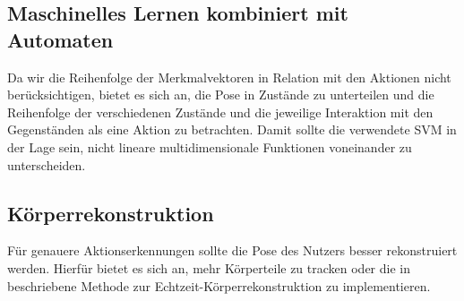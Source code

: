 \subsection{Maschinelles Lernen kombiniert mit Automaten}
Da wir die Reihenfolge der Merkmalvektoren in Relation mit den Aktionen nicht berücksichtigen, bietet es sich an, die Pose in Zustände zu unterteilen und die Reihenfolge der verschiedenen Zustände und die jeweilige Interaktion mit den Gegenständen als eine Aktion zu betrachten. Damit sollte die verwendete SVM in der Lage sein, nicht lineare multidimensionale Funktionen voneinander zu unterscheiden.

\subsection{Körperrekonstruktion}
Für genauere Aktionserkennungen sollte die Pose des Nutzers besser rekonstruiert werden. Hierfür bietet es sich an, mehr Körperteile zu tracken oder die in \cite{body-reconstruction} beschriebene Methode zur Echtzeit-Körperrekonstruktion zu implementieren.




